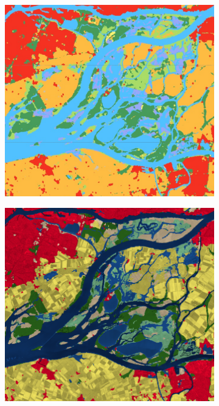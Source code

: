 \begin{figure}[H]
    \centering
    \begin{subfigure}[t]{0.243\textwidth}
        \centering
        \includegraphics[width=\textwidth,height=\textwidth]{figs_01/a_dynamicworld_clean.png}
    \end{subfigure}
    \hfill %
    \begin{subfigure}[t]{0.243\textwidth}
        \centering
        \includegraphics[width=\textwidth,height=\textwidth]{figs_01/a_esri_clean.png}

\end{subfigure}
\end{figure}
